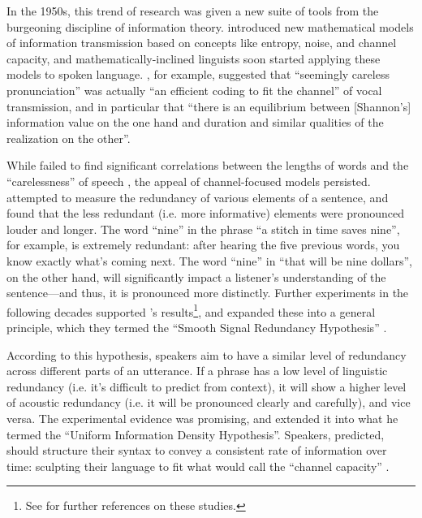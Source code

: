 \documentclass[12pt,twoside]{article}
\begin{document}
In the 1950s, this trend of research was given a new suite of tools from the burgeoning discipline of information theory. \citet{shannon} introduced new mathematical models of information transmission based on concepts like entropy, noise, and channel capacity, and mathematically-inclined linguists soon started applying these models to spoken language. \citet[674,676]{karlgren}, for example, suggested that ``seemingly careless pronunciation'' was actually ``an efficient coding to fit the channel'' of vocal transmission, and in particular that ``there is an equilibrium between [Shannon's] information value on the one hand and duration and similar qualities of the realization on the other''.


While \citeauthor{karlgren} failed to find significant correlations between the lengths of words and the ``carelessness'' of speech \citep{karlgren}, the appeal of channel-focused models persisted. \citet{lieberman} attempted to measure the redundancy of various elements of a sentence, and found that the less redundant (i.e. more informative) elements were pronounced louder and longer. The word ``nine'' in the phrase ``a stitch in time saves nine'', for example, is extremely redundant: after hearing the five previous words, you know exactly what's coming next. The word ``nine'' in ``that will be nine dollars'', on the other hand, will significantly impact a listener's understanding of the sentence---and thus, it is pronounced more distinctly. Further experiments in the following decades supported \citeauthor{lieberman}'s results\footnote{See \cite[32]{aylett} for further references on these studies.\citereset}, and \citet{aylett} expanded these into a general principle, which they termed the ``Smooth Signal Redundancy Hypothesis'' \citep[34]{aylett}.

According to this hypothesis, speakers aim to have a similar level of redundancy across different parts of an utterance. If a phrase has a low level of linguistic redundancy (i.e. it's difficult to predict from context), it will show a higher level of acoustic redundancy (i.e. it will be pronounced clearly and carefully), and vice versa. The experimental evidence was promising, and \citet{jaeger} extended it into what he termed the ``Uniform Information Density Hypothesis''. Speakers, \citeauthor{jaeger} predicted, should structure their syntax to convey a consistent rate of information over time: sculpting their language to fit what \citet{shannon} would call the ``channel capacity'' \citep[3]{jaeger}.
\end{document}
